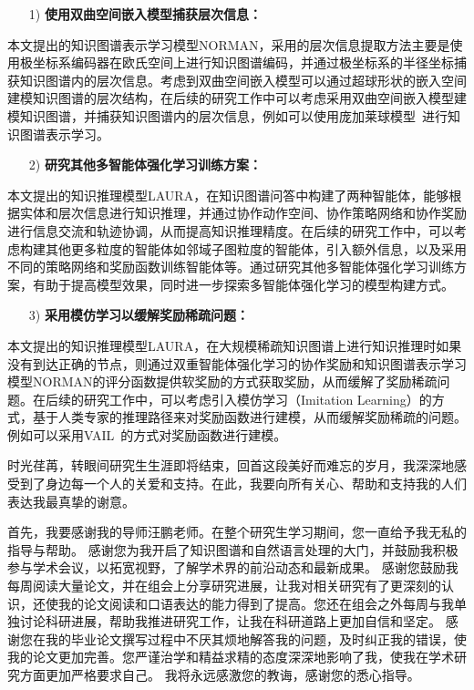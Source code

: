 \documentclass[algorithmlist, AutoFakeBold, AutoFakeSlant, figurelist, tablelist, nomlist, engineering, openany]{seuthesix} %
\begin{document}
\begin{itemize}[leftmargin=*]
  \item [1)]\textbf{使用双曲空间嵌入模型捕获层次信息：}
\end{itemize}

本文提出的知识图谱表示学习模型NORMAN，采用的层次信息提取方法主要是使用极坐标系编码器在欧氏空间上进行知识图谱编码，并通过极坐标系的半径坐标捕获知识图谱内的层次信息。考虑到双曲空间嵌入模型可以通过超球形状的嵌入空间建模知识图谱的层次结构，在后续的研究工作中可以考虑采用双曲空间嵌入模型建模知识图谱，并捕获知识图谱内的层次信息，例如可以使用庞加莱球模型~\cite{abramowicz2002poincare}进行知识图谱表示学习。

\begin{itemize}[leftmargin=*]
  \item [2)]\textbf{研究其他多智能体强化学习训练方案：}
\end{itemize}

本文提出的知识推理模型LAURA，在知识图谱问答中构建了两种智能体，能够根据实体和层次信息进行知识推理，并通过协作动作空间、协作策略网络和协作奖励进行信息交流和轨迹协调，从而提高知识推理精度。在后续的研究工作中，可以考虑构建其他更多粒度的智能体如邻域子图粒度的智能体，引入额外信息，以及采用不同的策略网络和奖励函数训练智能体等。通过研究其他多智能体强化学习训练方案，有助于提高模型效果，同时进一步探索多智能体强化学习的模型构建方式。

\begin{itemize}[leftmargin=*]
  \item [3)]\textbf{采用模仿学习以缓解奖励稀疏问题：}
\end{itemize}

本文提出的知识推理模型LAURA，在大规模稀疏知识图谱上进行知识推理时如果没有到达正确的节点，则通过双重智能体强化学习的协作奖励和知识图谱表示学习模型NORMAN的评分函数提供软奖励的方式获取奖励，从而缓解了奖励稀疏问题。在后续的研究工作中，可以考虑引入模仿学习（Imitation Learning）的方式，基于人类专家的推理路径来对奖励函数进行建模，从而缓解奖励稀疏的问题。例如可以采用VAIL~\cite{pengvariational}的方式对奖励函数进行建模。

\acknowledgement
时光荏苒，转眼间研究生生涯即将结束，回首这段美好而难忘的岁月，我深深地感受到了身边每一个人的关爱和支持。在此，我要向所有关心、帮助和支持我的人们表达我最真挚的谢意。

首先，我要感谢我的导师汪鹏老师。在整个研究生学习期间，您一直给予我无私的指导与帮助。
感谢您为我开启了知识图谱和自然语言处理的大门，并鼓励我积极参与学术会议，以拓宽视野，了解学术界的前沿动态和最新成果。
感谢您鼓励我每周阅读大量论文，并在组会上分享研究进展，让我对相关研究有了更深刻的认识，还使我的论文阅读和口语表达的能力得到了提高。您还在组会之外每周与我单独讨论科研进展，帮助我推进研究工作，让我在科研道路上更加自信和坚定。
感谢您在我的毕业论文撰写过程中不厌其烦地解答我的问题，及时纠正我的错误，使我的论文更加完善。您严谨治学和精益求精的态度深深地影响了我，使我在学术研究方面更加严格要求自己。
我将永远感激您的教诲，感谢您的悉心指导。
\end{document}
